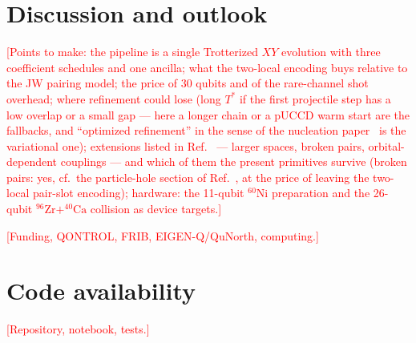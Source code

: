 \documentclass[
  aps,
  prc,
  reprint,
  superscriptaddress,
  floatfix,
  nofootinbib
]{revtex4-2}
\newcommand{\todo}[1]{\textcolor{red}{[#1]}}
\newcommand{\Ni}{^{60}\mathrm{Ni}}
\newcommand{\Zr}{^{96}\mathrm{Zr}}
\newcommand{\Ca}{^{40}\mathrm{Ca}}
\begin{document}
\section{Discussion and outlook}
\label{sec:discussion}
\todo{Points to make: the pipeline is a single Trotterized $XY$ evolution
with three coefficient schedules and one ancilla; what the two-local
encoding buys relative to the JW pairing model; the price of 30 qubits and
of the rare-channel shot overhead; where refinement could lose (long $T^*$
if the first projectile step has a low overlap or a small gap --- here a
longer chain or a pUCCD warm start are the fallbacks, and ``optimized
refinement'' in the sense of the nucleation paper~\cite{Sadia2026} is the
variational one); extensions listed in Ref.~\cite{TwoFragment2026} ---
larger spaces, broken pairs, orbital-dependent couplings --- and which of
them the present primitives survive (broken pairs: yes, cf.\ the
particle-hole section of Ref.~\cite{EigenQPairing2026}, at the price of
leaving the two-local pair-slot encoding); hardware: the 11-qubit $\Ni$
preparation and the 26-qubit $\Zr+\Ca$ collision as device targets.}

\begin{acknowledgments}
\todo{Funding, QONTROL, FRIB, EIGEN-Q/QuNorth, computing.}
\end{acknowledgments}

\section*{Code availability}
\todo{Repository, notebook, tests.}
\end{document}
